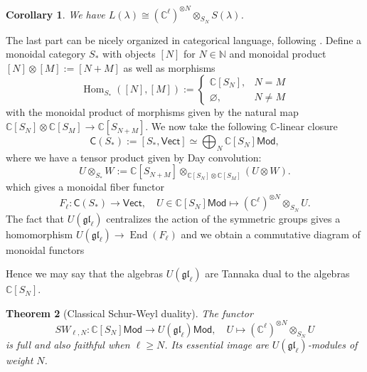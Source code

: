 \documentclass[11pt]{report}
\newtheorem{theorem}{Theorem}[section]
\newtheorem{corollary}[theorem]{Corollary}
\theoremstyle{definition}
\theoremstyle{remark}
\theoremstyle{remark}
\newcommand{\Hom}{\operatorname{Hom}}
\newcommand{\End}{\operatorname{End}}
\newcommand{\N}{\mathbb{N}}
\newcommand{\C}{\mathbb{C}}
\begin{document}
\begin{corollary}
We have $L(\lambda) \cong (\C^\ell)^{\otimes N} \otimes_{S_N} S(\lambda)$.
\end{corollary}

The last part can be nicely organized in categorical language, following \cite{article:davydov:2010}. Define a monoidal category $S_*$ with objects $[N]$ for $N \in \N$ and monoidal product $[N] \otimes [M] := [N+M]$ as well as morphisms
\begin{equation*}
\Hom_{S_*}([N],[M]) :=
\begin{cases}
\C[S_N], & N = M \\
\varnothing, & N \neq M
\end{cases}
\end{equation*}
with the monoidal product of morphisms given by the natural map $\C[S_N] \otimes \C[S_M] \to \C[S_{N+M}]$. We now take the following $\C$-linear closure
\begin{equation*}
\mathsf{C}(S_*) := [S_*,\mathsf{Vect}] \simeq \bigoplus_N \C[S_N]\mathsf{Mod},
\end{equation*}
where we have a tensor product given by Day convolution:
\begin{equation*}
U \otimes_{S_*} W := \C[S_{N+M}] \otimes_{\C[S_N] \otimes \C[S_M]} (U \otimes W).
\end{equation*}
which gives a monoidal fiber functor
\begin{equation*}
F_\ell: \mathsf{C}(S_*) \to \mathsf{Vect}, \quad U \in \C[S_N]\mathsf{Mod} \mapsto (\C^\ell)^{\otimes N} \otimes_{S_N} U.
\end{equation*}
The fact that $U(\mathfrak{gl}_\ell)$ centralizes the action of the symmetric groups gives a homomorphism $U(\mathfrak{gl}_\ell) \to \End(F_\ell)$ and we obtain a commutative diagram of monoidal functors
\begin{center}
\end{center}
Hence we may say that the algebras $U(\mathfrak{gl}_\ell)$ are Tannaka dual to the algebras $\C[S_N]$.

\begin{theorem}[Classical Schur-Weyl duality]
The functor
\begin{equation*}
SW_{\ell,N}: \C[S_N]\mathsf{Mod} \to U(\mathfrak{gl}_\ell)\mathsf{Mod}, \quad U \mapsto (\C^\ell)^{\otimes N} \otimes_{S_N} U
\end{equation*}
is full and also faithful when $\ell \geq N$. Its essential image are $U(\mathfrak{gl}_\ell)$-modules of weight $N$.
\end{theorem}
\end{document}
